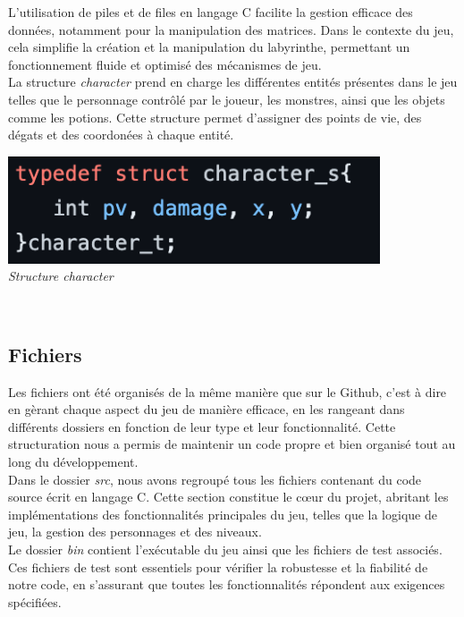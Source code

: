 \documentclass[10pt]{article}
\begin{document}
L'utilisation de piles et de files en langage C facilite la gestion efficace des données, notamment pour la manipulation des matrices. Dans le contexte du jeu, cela simplifie la création et la manipulation du labyrinthe, permettant un fonctionnement fluide et optimisé des mécanismes de jeu.\\

La structure \textit{\gls{character}} prend en charge les différentes entités présentes dans le jeu telles que le personnage contrôlé par le joueur, les monstres, ainsi que les objets comme les potions. Cette structure permet d'assigner des points de vie, des dégats et des coordonées à chaque entité.\\
\begin{center}
\includegraphics[width=11cm]{character.png}\\
\caption{{\emph{Structure character}}}
\label{fig15}\\
\end{center}


\subsection{Fichiers}

Les fichiers ont été organisés de la même manière que sur le Github, c'est à dire en gèrant chaque aspect du jeu de manière efficace, en les rangeant dans différents dossiers en fonction de leur type et leur fonctionnalité. Cette structuration nous a permis de maintenir un code propre et bien organisé tout au long du développement.\\

Dans le dossier \textit{src}, nous avons regroupé tous les fichiers contenant du code source écrit en langage C. Cette section constitue le cœur du projet, abritant les implémentations des fonctionnalités principales du jeu, telles que la logique de jeu, la gestion des personnages et des niveaux.\\

Le dossier \textit{bin} contient l'exécutable du jeu ainsi que les fichiers de test associés. Ces fichiers de test sont essentiels pour vérifier la robustesse et la fiabilité de notre code, en s'assurant que toutes les fonctionnalités répondent aux exigences spécifiées.\\
\end{document}
